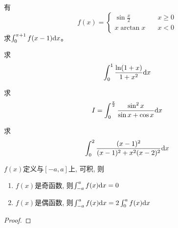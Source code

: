 \begin{example}
    有
    \begin{equation*}
        f(x) = \begin{cases}
            \sin\frac{x}{2} &\quad x \ge 0 \\
            x\arctan x &\quad x < 0
        \end{cases}
    \end{equation*}
    求$\int_{0}^{\pi+1}f(x-1)\mathrm{d} x$。                                                            
\end{example}
\begin{solution}
    
\end{solution}

\begin{example}
    求
    \begin{equation*}
        \int_0^1 \frac{\ln(1+x)}{1+x^2} \mathrm{d} x
    \end{equation*}
\end{example}

\begin{example}
    求
    \begin{equation*}
        I = \int_{0}^{\frac{\pi}{2}} \frac{\sin^2x}{\sin x+\cos x} \mathrm{d} x
    \end{equation*}
\end{example}
\begin{solution}
    
\end{solution}

\begin{example}
    求
    \begin{equation*}
        \int_0^2 \frac{(x-1)^2}{(x-1)^2+x^2(x-2)^2} \mathrm{d} x
    \end{equation*}
\end{example}
\begin{solution}
    
\end{solution}

\begin{theorem}
    $f(x)$定义与$[-a, a]$上, 可积, 则
    \begin{enumerate}
        \item $f(x)$是奇函数, 则$\int_{-a}^a f(x)\mathrm{d} x = 0$
        \item $f(x)$是偶函数, 则$\int_{-a}^af(x) \mathrm{d} x = 2\int_0^af(x) \mathrm{d} x$
    \end{enumerate}
\end{theorem}
\begin{proof}
    
\end{proof}

